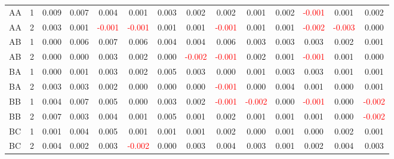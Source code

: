 \begin{table}[H]
{\begin{tabular}{llcccccccccccc}
AA & 1 & 0.009 & 0.007 & 0.004 & 0.001 & 0.003 & 0.002 & 0.002 & 0.001 & 0.002 & \textcolor{red}{-0.001} & 0.001 & 0.002\\
AA & 2 & 0.003 & 0.001 & \textcolor{red}{-0.001} & \textcolor{red}{-0.001} & 0.001 & 0.001 & \textcolor{red}{-0.001} & 0.001 & 0.001 & \textcolor{red}{-0.002} & \textcolor{red}{-0.003} & 0.000\\
AB & 1 & 0.000 & 0.006 & 0.007 & 0.006 & 0.004 & 0.004 & 0.006 & 0.003 & 0.003 & 0.003 & 0.002 & 0.001\\
AB & 2 & 0.000 & 0.000 & 0.003 & 0.002 & 0.000 & \textcolor{red}{-0.002} & \textcolor{red}{-0.001} & 0.002 & 0.001 & \textcolor{red}{-0.001} & 0.001 & 0.000\\
BA & 1 & 0.000 & 0.001 & 0.003 & 0.002 & 0.005 & 0.003 & 0.000 & 0.001 & 0.003 & 0.003 & 0.001 & 0.001\\
BA & 2 & 0.003 & 0.003 & 0.002 & 0.000 & 0.000 & 0.000 & \textcolor{red}{-0.001} & 0.000 & 0.004 & 0.001 & 0.000 & 0.001\\
BB & 1 & 0.004 & 0.007 & 0.005 & 0.000 & 0.003 & 0.002 & \textcolor{red}{-0.001} & \textcolor{red}{-0.002} & 0.000 & \textcolor{red}{-0.001} & 0.000 & \textcolor{red}{-0.002}\\
BB & 2 & 0.007 & 0.003 & 0.004 & 0.001 & 0.005 & 0.001 & 0.002 & 0.001 & 0.001 & 0.001 & 0.000 & \textcolor{red}{-0.002}\\
BC & 1 & 0.001 & 0.004 & 0.005 & 0.001 & 0.001 & 0.001 & 0.002 & 0.000 & 0.001 & 0.000 & 0.002 & 0.001\\
BC & 2 & 0.004 & 0.002 & 0.003 & \textcolor{red}{-0.002} & 0.000 & 0.003 & 0.004 & 0.003 & 0.001 & 0.002 & 0.004 & 0.003\\
\hline
    \end{tabular}%
    }
    \label{tab:cen2_uni}
\end{table}

